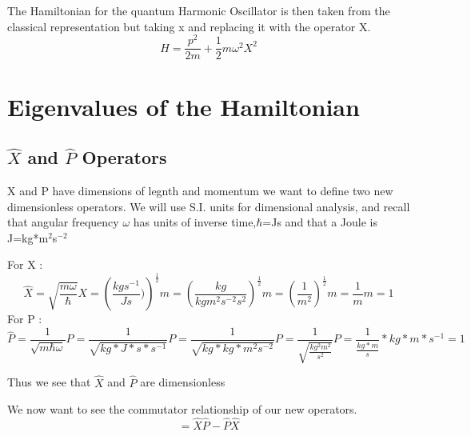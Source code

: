 \documentclass{article}
\newcommand{\be}{\begin{equation}}
\newcommand{\ee}{\end{equation}}
\begin{document}
The Hamiltonian for the quantum Harmonic Oscillator is then taken from the classical representation but taking x and replacing it with the operator X.
\be
H=\frac{p^2}{2m} + \frac{1}{2}m\omega^2X^2
\ee
\section{Eigenvalues of the Hamiltonian}

\subsection{$\hat{X}$ and $\hat{P}$ Operators}

X and P have dimensions of legnth and momentum we want to define two new dimensionless operators. We will use S.I. units for dimensional analysis, and recall that angular frequency $\omega$  has units of inverse time,$\hbar$=Js and that a Joule is J=kg*m$^2$s$^{-2}$

For X : 
\be
\hat{X}=\sqrt{\frac{m\omega}{\hbar}}X=\left(\frac{kgs^{-1}}{Js})\right)^{\frac{1}{2}}m = \left(\frac{kg}{kgm^{2}s^{-2}s^{2}}\right)^{\frac{1}{2}}m = \left(\frac{1}{m^2}\right)^{\frac{1}{2}} m = \frac{1}{m}m = 1
\ee
For P : 
\be
\hat{P} = \frac{1}{\sqrt{m\hbar \omega}} P = \frac{1}{\sqrt{kg *J*s*s^{-1}}} P = \frac{1}{\sqrt{kg*kg*m^2s^{-2}}} P = \frac{1}{\sqrt{\frac{kg^2m^2}{s^2}}} P = \frac{1}{\frac{kg*m}{s}}*kg*m*s^{-1} = 1
\ee

Thus we see that $\hat{X}$ and $\hat{P}$ are dimensionless

We now want to see the commutator relationship of our new operators. 
\be
[\hat{X},\hat{P}] = \hat{X}\hat{P} - \hat{P}\hat{X}
\ee
\end{document}
